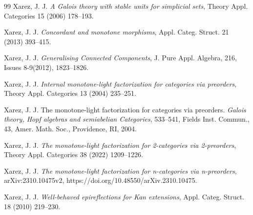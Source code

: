 \documentclass[12pt,a4paper]{amsart}
\theoremstyle{definition}
\begin{document}
\begin{thebibliography}{99}
Xarez, J. J. \emph{A Galois theory with stable units for simplicial sets}, Theory Appl. Categories 15 (2006) 178--193.

Xarez, J. J. \emph{Concordant and monotone morphisms}, Appl. Categ. Struct. 21 (2013) 393--415.

Xarez, J. J. \emph{Generalising Connected Components}, J. Pure Appl. Algebra, 216, Issues 8-9(2012), 1823--1826.

Xarez, J. J. \emph{Internal monotone-light factorization for categories via preorders}, Theory
Appl. Categories 13 (2004) 235--251.

Xarez, J. J. The monotone-light factorization for categories via
preorders. \emph{Galois theory, Hopf algebras and semiabelian
Categories}, 533--541, Fields Inst. Commun., 43, Amer. Math. Soc.,
Providence, RI, 2004.

Xarez, J. J. \emph{The monotone-light factorization for 2-categories via
2-preorders}, Theory Appl. Categories 38 (2022) 1209--1226.

Xarez, J. J. \emph{The monotone-light factorization for n-categories via
n-preorders}, arXiv:2310.10475v2, https://doi.org/10.48550/arXiv.2310.10475.

Xarez, J. J. \emph{Well-behaved epireflections for Kan extensions}, Appl. Categ. Struct. 18 (2010) 219--230.


\end{thebibliography}
\end{document}
